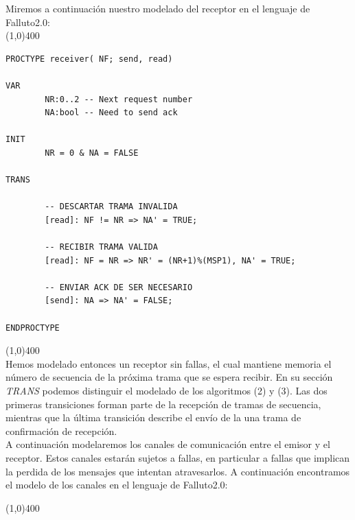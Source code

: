 \documentclass[titlepage, 12pt]{book}
\begin{document}
Miremos a continuaci\'on nuestro modelado del receptor en el lenguaje de Falluto2.0:\\

\noindent \line(1,0){400}\\

\begin{verbatim}
PROCTYPE receiver( NF; send, read)

VAR
        NR:0..2 -- Next request number
        NA:bool -- Need to send ack

INIT
        NR = 0 & NA = FALSE

TRANS

        -- DESCARTAR TRAMA INVALIDA
        [read]: NF != NR => NA' = TRUE;

        -- RECIBIR TRAMA VALIDA
        [read]: NF = NR => NR' = (NR+1)%(MSP1), NA' = TRUE;

        -- ENVIAR ACK DE SER NECESARIO
        [send]: NA => NA' = FALSE;

ENDPROCTYPE
\end{verbatim}

\noindent \line(1,0){400}\\

Hemos modelado entonces un receptor sin fallas, el cual mantiene memoria el número de secuencia de la próxima trama que se espera recibir. En su sección \textit{TRANS} podemos distinguir el modelado de los algoritmos (2) y (3). Las dos primeras transiciones forman parte de la recepción de tramas de secuencia, mientras que la última transición describe el envío de la una trama de confirmación de recepción.\\

A continuación modelaremos los canales de comunicación entre el emisor y el receptor. Estos canales estarán sujetos a fallas, en particular a fallas que implican la perdida de los mensajes que intentan atravesarlos. A continuación encontramos el modelo de los canales en el lenguaje de Falluto2.0:

\noindent \line(1,0){400}
\end{document}
